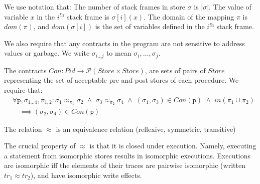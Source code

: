 \documentclass[runningheads,a4paper]{llncs}
\DeclareMathOperator{\band}{\bm{\;\land\;}}
\DeclareMathOperator{\suchthat}{:}
\newcommand*{\qvars}[2]{#1_{#2}}
\newcommand*{\powerset}[1]{\mathcal{P}(#1)}
\newcommand*{\domain}[1]{\mathit{dom}(#1)}
\newcommand*{\cardinality}[1]{\left|{#1}\right|}
\newcommand*{\Store}{\mathit{Store}}
\newcommand{\tr}{tr}
\newcommand*{\Contract}{\mathit{Con}}
\newcommand*\iso{\approx}
\newcommand*{\PName}{\mathit{Pid}}
\newcommand*{\fun}{\texttt{p}}
\newcommand*{\bijection}[1]{\mathit{in}{\left(#1\right)}}
\newcommand*{\store}{\sigma}
\newcommand*{\isoref}{\hyperref[def:global isomorphism]{\ensuremath{\iso}}}
\begin{document}
We use notation that: The number of stack frames in store $\store$ is $\cardinality{\store}$. The value of variable $x$ in the $i^{\textit{th}}$ stack frame is $\store[i](x)$. The domain of the mapping $\pi$ is $\domain{\pi}$, and $\domain{\store[i]}$ is the set of variables defined in the $i^{\textit{th}}$ stack frame.

We also require that any contracts in the program are not sensitive to address values or garbage. We write $\qvars{\store}{i \ldots j}$ to mean $\store_i,\ldots,\store_j$.
\begin{definition}\label{def:contracts}
The contracts $\Contract: \PName \rightarrow \powerset{\Store \times \Store}$, are sets of pairs of $\Store$ representing the set of acceptable pre and post stores of each procedure. We require that:
\[\begin{aligned}
	&	\forall \fun,\qvars{\store}{1 \ldots 4},\qvars{\pi}{1,2} \suchthat
		\store_1 \iso_{\pi_1} \store_2 \band \store_3 \iso_{\pi_2} \store_4 \band (\store_1,\store_3) \in \Contract(\fun) \band \bijection{\pi_1 \cup \pi_2}  \\
	&\quad	\implies
		(\store_2,\store_4) \in \Contract(\fun)
\end{aligned}\]
\end{definition}

\begin{lemma}\label{lem:isomorphism is equivalence}
The relation $\iso$ is an equivalence relation (reflexive, symmetric, transitive)
\end{lemma}

The crucial property of \isoref{} is that it is closed under execution. Namely, executing a statement from isomorphic stores results in isomorphic executions. Executions are isomorphic iff the elements of their traces are pairwise isomorphic (written $\tr_1 \iso \tr_2$), and have isomorphic write effects.
\end{document}
